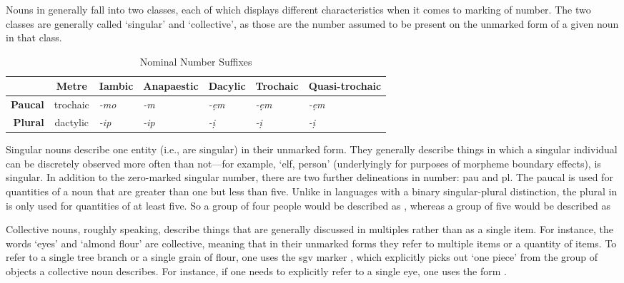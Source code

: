Nouns in \parentlang{} generally fall into two classes, each of which displays different characteristics when it comes to marking of number. The two classes are generally called `singular' and `collective', as those are the number assumed to be present on the unmarked form of a given noun in that class. 

\begin{table}[htb]
    \centering
    \begin{tabular}{@{}rclllll@{}}
    \toprule
     & \textbf{Metre} & \multicolumn{1}{c}{\textbf{Iambic}} & \multicolumn{1}{c}{\textbf{Anapaestic}} & \multicolumn{1}{c}{\textbf{Dacylic}} & \multicolumn{1}{c}{\textbf{Trochaic}} & \multicolumn{1}{c}{\textbf{Quasi-trochaic}} \\\midrule
    \textbf{Paucal} & trochaic & \textit{-\supglot{}mo} & \textit{-\supglot{}m} & \textit{-\supglot{}ẹm} & \textit{-\supglot{}ẹm} & \textit{-\supglot{}ẹm} \\
    \textbf{Plural} & dactylic & \textit{-\supglot{}\ppa{}ip} & \textit{-\supglot{}\ppa{}ip} & \textit{-\supglot{}ị\ppa{}} & \textit{-\supglot{}ị\ppa{}} & \textit{-\supglot{}ị\ppa{}} \\\bottomrule
    \end{tabular}
    \caption{Nominal Number Suffixes}
    \label{tab:noun-num}
\end{table}

Singular nouns describe one entity (i.e., are singular) in their unmarked form. They generally describe things in which a singular individual can be discretely observed more often than not---for example,  `elf, person' (underlyingly  for purposes of morpheme boundary effects), is singular. In addition to the zero-marked singular number, there are two further delineations in number: \gls{pau} and \gls{pl}. The paucal is used for quantities of a noun that are greater than one but less than five. Unlike in languages with a binary singular-plural distinction, the plural in \parentlang{} is only used for quantities of at least five. So a group of four people would be described as , whereas a group of five would be described as 

Collective nouns, roughly speaking, describe things that are generally discussed in multiples rather than as a single item. For instance, the words  `eyes' and  `almond flour' are collective, meaning that in their unmarked forms they refer to multiple items or a quantity of items. To refer to a single tree branch or a single grain of flour, one uses the \gls{sgv} marker , which explicitly picks out `one piece' from the group of objects a collective noun describes. For instance, if one needs to explicitly refer to a single eye, one uses the form . 

